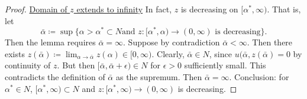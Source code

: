 \begin{lemma}
\begin{proof}
\seperate

\underline{Domain of $z$ extends to infinity}
In fact, $z$ is decreasing on $[\alpha^*,\infty)$.
That is, let $$\bar\alpha\coloneqq\sup\{\alpha>\alpha^*\subset N\text{
and }z:[\alpha^*,\alpha)\to(0,\infty)\text{ is decreasing}\}.$$
Then the lemma requires $\bar\alpha=\infty$.
Suppose by contradiction $\bar\alpha<\infty$.
Then there exists $z(\bar\alpha)\coloneqq\lim_{\alpha\to\bar\alpha}z(\alpha)\in[0,\infty).$
Clearly, $\bar\alpha\in N$, since $u(\bar\alpha,z(\bar\alpha)=0$ by continuity of $z$.
But then $[\bar\alpha,\bar\alpha+\epsilon)\in N$ for $\epsilon>0$ sufficiently small.
This contradicts the definition of $\bar\alpha$ as the supremum.
Then $\bar\alpha=\infty$.
Conclusion: for $\alpha^*\in N$, $[\alpha^*,\infty)\subset N$
and $z:[\alpha^*,\infty)\to(0,\infty)$ is decreasing.

\end{proof}
\end{lemma}



